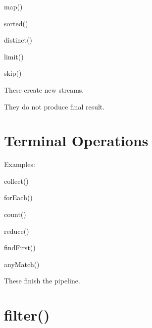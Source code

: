 \documentclass[11pt,a4paper]{book}
\begin{document}
map()


sorted()


distinct()


limit()


skip()


These create new streams.


They do not produce final result.


\section{Terminal Operations}

Examples:


collect()


forEach()


count()


reduce()


findFirst()


anyMatch()


These finish the pipeline.


\section{filter()}
\end{document}
